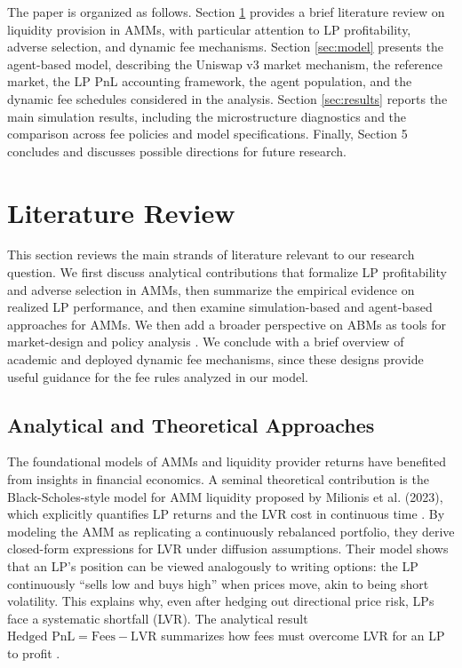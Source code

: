 \documentclass[11pt]{article}
\begin{document}
The paper is organized as follows. Section \ref{sec:literature_review} provides a brief literature review on liquidity provision in AMMs, with particular attention to LP profitability, adverse selection, and dynamic fee mechanisms. Section \ref{sec:model} presents the agent-based model, describing the Uniswap v3 market mechanism, the reference market, the LP PnL accounting framework, the agent population, and the dynamic fee schedules considered in the analysis. Section \ref{sec:results} reports the main simulation results, including the microstructure diagnostics and the comparison across fee policies and model specifications. Finally, Section 5 concludes and discusses possible directions for future research.

\section{Literature Review}
\label{sec:literature_review}
This section reviews the main strands of literature relevant to our research question. We first discuss analytical contributions that formalize LP profitability and adverse selection in AMMs, then summarize the empirical evidence on realized LP performance, and then examine simulation-based and agent-based approaches for AMMs. We then add a broader perspective on ABMs as tools for market-design and policy analysis \cite{raberto2001,chakraborti2011,mizuta2020}. We conclude with a brief overview of academic and deployed dynamic fee mechanisms, since these designs provide useful guidance for the fee rules analyzed in our model.

\subsection{Analytical and Theoretical Approaches}
The foundational models of AMMs and liquidity provider returns have benefited from insights in financial economics. A seminal theoretical contribution is the Black-Scholes-style model for AMM liquidity proposed by Milionis et al. (2023), which explicitly quantifies LP returns and the LVR cost in continuous time \cite{milionis2023}. By modeling the AMM as replicating a continuously rebalanced portfolio, they derive closed-form expressions for LVR under diffusion assumptions. Their model shows that an LP's position can be viewed analogously to writing options: the LP continuously ``sells low and buys high'' when prices move, akin to being short volatility. This explains why, even after hedging out directional price risk, LPs face a systematic shortfall (LVR). The analytical result $\text{Hedged PnL} = 	\text{Fees} - \text{LVR}$ summarizes how fees must overcome LVR for an LP to profit \cite{milionis2023}.
\end{document}
